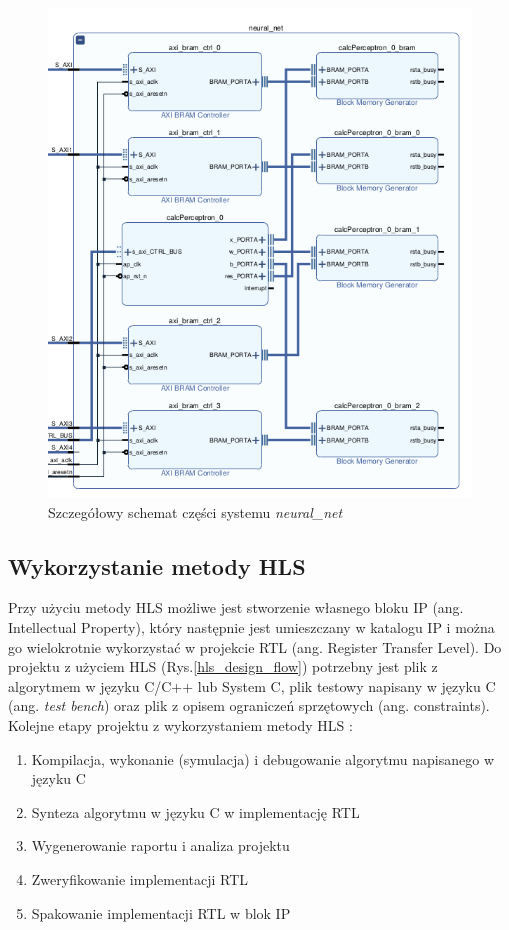 \begin{figure}[h]
  \centering
  \includegraphics[width=\textwidth]{img/vivado-neuralnet.png}
  \caption{Szczegółowy schemat części systemu \emph{neural\_net}}
  \label{vivado-block-neural}
\end{figure}


\subsection{Wykorzystanie metody HLS}
Przy użyciu metody HLS możliwe jest stworzenie własnego bloku IP (ang. 
Intellectual Property), który następnie jest umieszczany w katalogu IP i można 
go wielokrotnie wykorzystać w projekcie RTL (ang. Register Transfer Level).
Do projektu z użyciem HLS (Rys.\ref{hls_design_flow}) potrzebny jest plik 
z algorytmem w języku C/C++ lub System C, plik testowy napisany w języku C 
(ang. \emph{test bench}) oraz plik z opisem ograniczeń sprzętowych (ang. constraints).
Kolejne etapy projektu z wykorzystaniem metody HLS \cite{hlsXilinxGuide}:

\begin{enumerate}
    \item Kompilacja, wykonanie (symulacja) i debugowanie algorytmu napisanego w języku C
    \item Synteza algorytmu w języku C w implementację RTL
    \item Wygenerowanie raportu i analiza projektu
    \item Zweryfikowanie implementacji RTL
    \item Spakowanie implementacji RTL w blok IP
\end{enumerate}


